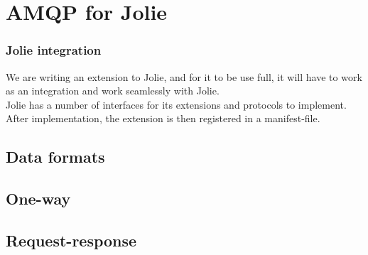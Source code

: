 \section{AMQP for Jolie}
\subsubsection{Jolie integration}
We are writing an extension to Jolie, and for it to be use full, it will have to work as an integration and work seamlessly with Jolie.\\
Jolie has a number of interfaces for its extensions and protocols to implement. After implementation, the extension is then registered in a manifest-file.
\subsection{Data formats}
\subsection{One-way}
\subsection{Request-response}
\newpage